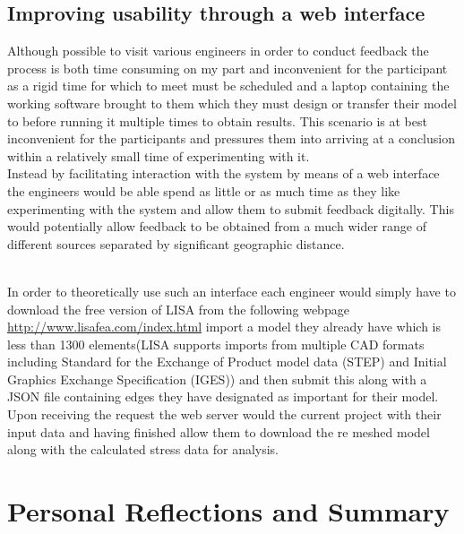 \documentclass{article}
\begin{document}
\subsection{Improving usability through a web interface}
Although possible to visit various engineers in order to conduct feedback the process is both time consuming on my part and inconvenient for the participant as a rigid time for which to meet must be scheduled and a laptop containing the working software brought to them which they must design or transfer their model to before running it multiple times to obtain results. This scenario is at best inconvenient for the participants and pressures them into arriving at a conclusion within a relatively small time of experimenting with it. \\ 

\noindent
Instead by facilitating interaction with the system by means of a web interface the engineers would be able spend as little or as much time as they like experimenting with the system and allow them to submit feedback digitally. This would potentially allow feedback to be obtained from  a much wider range of different sources separated by significant geographic distance. \\\ 

\noindent
In order to theoretically use such an interface each engineer would simply have to download the free version of LISA from the following webpage \url{http://www.lisafea.com/index.html} import a model they already have which is less than 1300 elements(LISA supports imports from multiple CAD formats including Standard for the Exchange of Product model data (STEP) and Initial Graphics Exchange Specification (IGES)) \cite{LISAReference} and then submit this along with a JSON file containing edges they have designated as important for their model. Upon receiving the request the web server would the current project with their input data and having finished allow them to download the re meshed model along with the calculated stress data for analysis.


\section{Personal Reflections and Summary}
\end{document}
